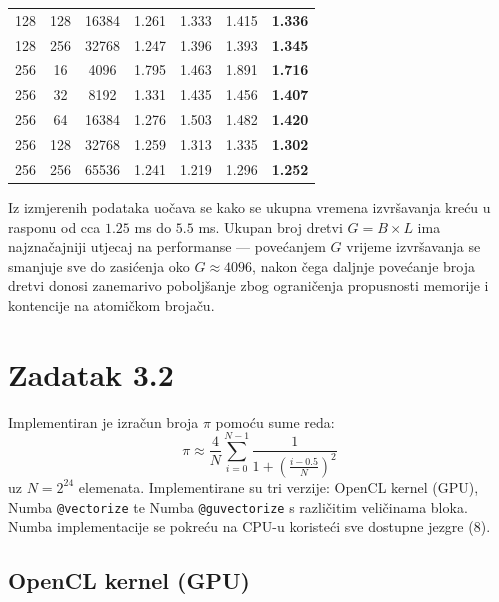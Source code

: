 \documentclass[12pt,a4paper]{article}
\begin{document}
\begin{table}[h!]
\begin{tabular}{ccccccc}
128 & 128 & 16384 & 1.261 & 1.333 & 1.415 & \textbf{1.336} \\
128 & 256 & 32768 & 1.247 & 1.396 & 1.393 & \textbf{1.345} \\
\midrule
256 & 16  & 4096  & 1.795 & 1.463 & 1.891 & \textbf{1.716} \\
256 & 32  & 8192  & 1.331 & 1.435 & 1.456 & \textbf{1.407} \\
256 & 64  & 16384 & 1.276 & 1.503 & 1.482 & \textbf{1.420} \\
256 & 128 & 32768 & 1.259 & 1.313 & 1.335 & \textbf{1.302} \\
256 & 256 & 65536 & 1.241 & 1.219 & 1.296 & \textbf{1.252} \\
\bottomrule
\end{tabular}
\end{table}

\noindent Iz izmjerenih podataka uočava se kako se ukupna vremena izvršavanja
kreću u rasponu od cca $1.25$ ms do $5.5$ ms.
Ukupan broj dretvi $G = B \times L$ ima najznačajniji utjecaj na
performanse --- povećanjem $G$ vrijeme izvršavanja se smanjuje sve do
zasićenja oko $G \approx 4096$, nakon čega daljnje povećanje broja dretvi
donosi zanemarivo poboljšanje zbog ograničenja propusnosti memorije i
kontencije na atomičkom brojaču.

\section{Zadatak 3.2}

Implementiran je izračun broja $\pi$ pomoću sume reda:
\begin{equation}
  \pi \approx \frac{4}{N} \sum_{i=0}^{N-1} \frac{1}{1 + \left(\frac{i - 0.5}{N}\right)^2}
\end{equation}
uz $N = 2^{24}$ elemenata. Implementirane su tri verzije:
OpenCL kernel (GPU), Numba \texttt{@vectorize} te Numba
\texttt{@guvectorize} s različitim veličinama bloka. Numba
implementacije se pokreću na CPU-u koristeći sve dostupne jezgre (8).

\subsection{OpenCL kernel (GPU)}
\end{document}
